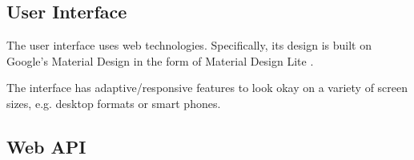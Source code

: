 \subsection{User Interface}
\label{gXLII:sec:implementation:UI}  %

The user interface uses web technologies. Specifically, its design is built on Google's Material Design in the form of Material Design Lite .

The interface has adaptive/responsive features to look okay on a variety of screen sizes, e.g. desktop formats or smart phones. 

\subsection{Web API}
\label{gXLII:sec:implementation:API}  %




